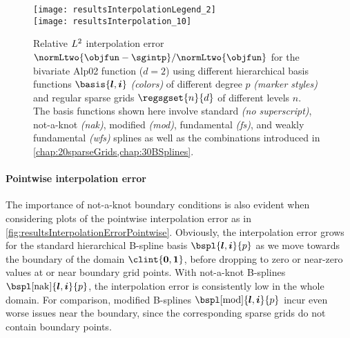 \begin{SCfigure}
  \begin{minipage}{102mm}%
    \hspace*{10mm}%
    \texttt{[image: resultsInterpolationLegend\_2]}\\[2mm]%
    \texttt{[image: resultsInterpolation\_10]}%
  \end{minipage}%
  \caption[Relative interpolation error for different basis functions]{%
    Relative $L^2$ interpolation error
    $\normLtwo{\objfun - \sgintp}/\normLtwo{\objfun}$
    for the bivariate Alp02 function ($d = 2$)
    using different hierarchical basis functions
    $\basis{\*l,\*i}$ \emph{(colors)}
    of different degree $p$ \emph{(marker styles)} and
    regular sparse grids $\regsgset{n}{d}$ of different levels $n$.\\
    The basis functions shown here involve
    standard \emph{(no superscript)},
    not-a-knot \emph{(nak)},
    modified \emph{(mod)},
    fundamental \emph{(fs)}, and
    weakly fundamental \emph{(wfs)}
    splines as well as the combinations
    introduced in \cref{chap:20sparseGrids,chap:30BSplines}.%
  }%
  \label{fig:resultsInterpolationErrorBasisFunctions}%
\end{SCfigure}

\paragraph{Pointwise interpolation error}

The importance of not-a-knot boundary conditions is also evident
when considering plots of the pointwise interpolation error as in
\cref{fig:resultsInterpolationErrorPointwise}.
Obviously, the interpolation error grows for the standard hierarchical
B-spline basis $\bspl{\*l,\*i}{p}$
as we move towards the boundary of the domain $\clint{\*0, \*1}$,
before dropping to zero or near-zero values at or near boundary grid points.
With not-a-knot B-splines $\bspl[\nak]{\*l,\*i}{p}$,
the interpolation error is consistently low in the whole domain.
For comparison, modified B-splines $\bspl[\modified]{\*l,\*i}{p}$
incur even worse issues near the boundary, since the corresponding sparse grids
do not contain boundary points.

